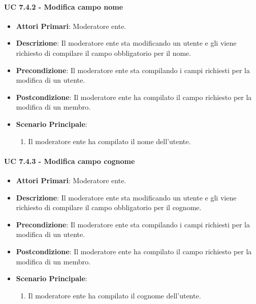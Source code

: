 			\paragraph{UC 7.4.2 - Modifica campo nome}
			\begin{itemize}
				\item \textbf{Attori Primari}: Moderatore ente.
				\item \textbf{Descrizione}: Il moderatore ente sta modificando un utente e gli viene richiesto di compilare il campo obbligatorio per il nome.
				\item \textbf{Precondizione}: Il moderatore ente sta compilando i campi richiesti per la modifica di un utente.
				\item \textbf{Postcondizione}: Il moderatore ente ha compilato il campo richiesto per la modifica di un membro.
				\item \textbf{Scenario Principale}:
				\begin{enumerate}
					\item{Il moderatore ente ha compilato il nome dell'utente.}
				\end{enumerate}	
			\end{itemize}

			\paragraph{UC 7.4.3 - Modifica campo cognome}
			\begin{itemize}
				\item \textbf{Attori Primari}: Moderatore ente.
				\item \textbf{Descrizione}: Il moderatore ente sta modificando un utente e gli viene richiesto di compilare il campo obbligatorio per il cognome.
				\item \textbf{Precondizione}: Il moderatore ente sta compilando i campi richiesti per la modifica di un utente.
				\item \textbf{Postcondizione}: Il moderatore ente ha compilato il campo richiesto per la modifica di un membro.
				\item \textbf{Scenario Principale}:
				\begin{enumerate}
					\item{Il moderatore ente ha compilato il cognome dell'utente.}
				\end{enumerate}	
			\end{itemize}

			
